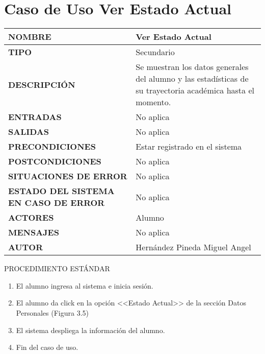 \newpage
\section{Caso de Uso Ver Estado Actual}
\begin{longtable}{ | p{6cm} | p{10cm} |}
\hline
\textbf{NOMBRE} & Ver Estado Actual\\
\hline
\textbf{TIPO} & Secundario\\
\hline
\textbf{DESCRIPCIÓN} & Se muestran los datos generales del alumno y las estadísticas de su trayectoria académica hasta el momento.\\
\hline
\textbf{ENTRADAS} & No aplica\\
\hline
\textbf{SALIDAS} & No aplica\\
\hline
\textbf{PRECONDICIONES} & Estar registrado en el sistema\\
\hline
\textbf{POSTCONDICIONES} & No aplica\\
\hline
\textbf{SITUACIONES DE ERROR} & No aplica\\
\hline
\textbf{ESTADO DEL SISTEMA EN CASO DE ERROR} & No aplica\\
\hline
\textbf{ACTORES} & Alumno\\
\hline
\textbf{MENSAJES} & No aplica\\
\hline
\textbf{AUTOR} & Hernández Pineda Miguel Angel\\
\hline
\end{longtable}
\vspace*{1cm}
\noindent
\Large{PROCEDIMIENTO ESTÁNDAR}
\large{}
\begin{enumerate}
    \item El alumno ingresa al sistema e inicia sesión.
    \item El alumno da click en la opción <<Estado Actual>> de la sección Datos Personales (Figura 3.5)
    \item El sistema despliega la información del alumno.
    \item Fin del caso de uso.
\end{enumerate}